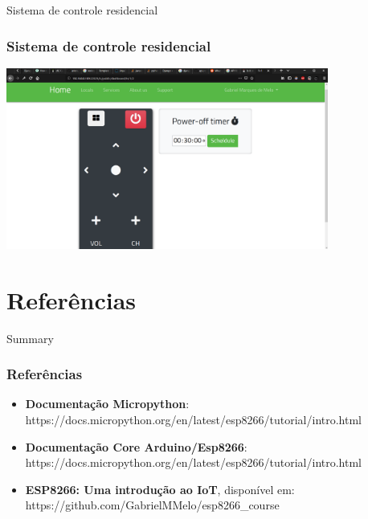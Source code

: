 \documentclass[10pt, compress]{beamer}
\begin{document}
\begin{frame}{Sistema de controle residencial}
  \frametitle{Sistema de controle residencial}
  \includegraphics[width=300pt]{images/iot-server_remotecontrol.png}
\end{frame}
\section{Referências}

\begin{frame}{Summary}
  \frametitle{Referências}
  \begin{itemize}
    \item \textbf{Documentação Micropython}: https://docs.micropython.org/en/latest/esp8266/tutorial/intro.html \vspace{5pt}
    \item \textbf{Documentação Core Arduino/Esp8266}: https://docs.micropython.org/en/latest/esp8266/tutorial/intro.html \vspace{5pt}
    \item \textbf{ESP8266: Uma introdução ao IoT}, disponível em: https://github.com/GabrielMMelo/esp8266\_course
  \end{itemize}
\end{frame}

\end{document}

